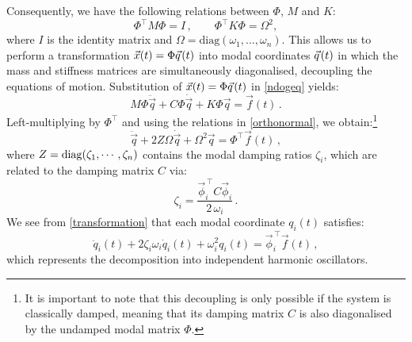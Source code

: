 \documentclass[../Thesis-IJspeert.tex]{subfiles}
\begin{document}
Consequently, we have the following relations between $\Phi$, $M$ and $K$:
\begin{equation}
\label{orthonormal}
\Phi^{\!\top} \!M \Phi = I\,, \qquad \Phi^{\!\top} \!K \Phi = \Omega^{2},
\end{equation}
where $I$ is the identity matrix and $\Omega = \text{diag}(\omega_1, \dots, \omega_n)$.
This allows us to perform a transformation $\vec{x}(t) = \Phi \vec{q}\hspace{0.1em}(t)$ into modal coordinates $\vec{q}\hspace{0.1em}(t)$ in which the mass and stiffness matrices are simultaneously diagonalised, decoupling the equations of motion. Substitution of $\vec{x}(t) = \Phi \vec{q}\hspace{0.1em}(t)$ in \autoref{ndogeq} yields:
\begin{equation}
M \Phi \ddot{\vec{q}} + C \Phi  \dot{\vec{q}} + K \Phi  \vec{q} = \vec{f}(t)\,.
\end{equation}
Left-multiplying by $\Phi^{\!\top}$ and using the relations in \autoref{orthonormal}, we obtain:\footnote{It is important to note that this decoupling is only possible if the system is classically damped, meaning that its damping matrix $C$ is also diagonalised by the undamped modal matrix $\Phi$.}
\begin{equation}
\label{transformation}
\ddot{\vec{q}} + 2 Z \Omega \dot{\vec{q}} + \Omega^{2} \vec{q} = \Phi^{\!\top} \!\vec{f}(t)\,,
\end{equation}
where $Z=\operatorname{diag}(\zeta_1, \cdots, \zeta_n)$ contains the modal damping ratios $\zeta_{i}$, which are related to the damping matrix $C$ via:
\begin{equation}
\zeta_i = \frac{\vec{\phi}_i^{\,\top} \!C  \vec{\phi}_i}{2 \, \omega_i}\,.
\end{equation}
We see from \autoref{transformation} that each modal coordinate $q_{i}(t)$ satisfies:
\begin{equation}\label{eq:modal-scalar}
\ddot{q}_{i}(t) + 2 \zeta_{i} \omega_{i} \dot{q}_{i}(t) + \omega_{i}^{2} q_{i}(t) = \vec{\phi}_{i}^{\,\top} \!\vec{f}(t)\,,
\end{equation}
which represents the decomposition into independent harmonic oscillators.
\end{document}
